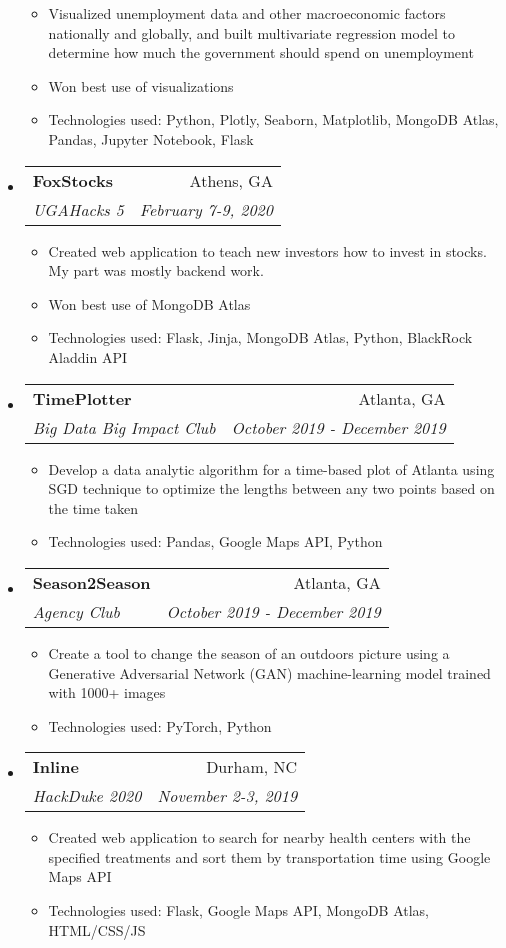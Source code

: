 \documentclass[letterpaper,11pt]{article}
\makeatletter
\newcommand{\resitem}[1]{\item #1 \vspace{-2pt}}
\newcommand{\ressubheading}[4]{
\begin{tabular*}{7.0in}{l@{\extracolsep{\fill}}r}
		\textbf{#1} & #2 \\
		\textit{#3} & \textit{#4} \\
\end{tabular*}\vspace{-6pt}}
\makeatother
\begin{document}
\begin{itemize}
\begin{itemize}
        \resitem{Visualized unemployment data and other macroeconomic factors nationally and globally, and built multivariate regression model to determine how much the government should spend on unemployment}
        \resitem{Won best use of visualizations}
        \resitem{Technologies used: Python, Plotly, Seaborn, Matplotlib, MongoDB Atlas, Pandas, Jupyter Notebook, Flask}
    \end{itemize}
\item
    \ressubheading{FoxStocks}{Athens, GA}{UGAHacks 5}{February 7-9, 2020}
    \begin{itemize}
        \item Created web application to teach new investors how to invest in stocks. My part was mostly backend work. 
        \item Won best use of MongoDB Atlas
        \item Technologies used: Flask, Jinja, MongoDB Atlas, Python, BlackRock Aladdin API
    \end{itemize}
\item
    \ressubheading{TimePlotter}{Atlanta, GA}{Big Data Big Impact Club}{October 2019 - December 2019}
    \begin{itemize}
        \item Develop a data analytic algorithm for a time-based plot of Atlanta using SGD technique to optimize the lengths between any two points based on the time taken
        \item Technologies used: Pandas, Google Maps API, Python
    \end{itemize}
\item
    \ressubheading{Season2Season}{Atlanta, GA}{Agency Club}{October 2019 - December 2019}
    \begin{itemize}
        \item Create a tool to change the season of an outdoors picture using a Generative Adversarial Network (GAN) machine-learning model trained with 1000+ images
        \item Technologies used: PyTorch, Python
    \end{itemize}
\item
    \ressubheading{Inline}{Durham, NC}{HackDuke 2020}{November 2-3, 2019}
    \begin{itemize}
        \item Created web application to search for nearby health centers with the specified treatments and sort them by transportation time using Google Maps API
        \item Technologies used: Flask, Google Maps API, MongoDB Atlas, HTML/CSS/JS

\end{itemize}
\end{itemize}
\end{document}
